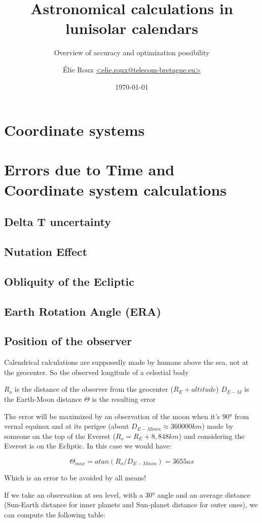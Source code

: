 \documentclass[%
a4paper,%
pagesize,%
12pt,%
parskip=off,%
bibliography=totoc,%
numbers=noenddot,%
DIV=12,%
twoside=semi,%
normalheadings%
]{scrbook}
\title{Astronomical calculations in lunisolar calendars}
\subtitle{Overview of accuracy and optimization possibility}
\author{Élie Roux \href{mailto:elie.roux@telecom-bretagne.eu}{<elie.roux@telecom-bretagne.eu>}}
\date{\today}
\let\mychapter\chapter
\let\mysection\section
\begin{document}
\maketitle

\tableofcontents
\newpage











\mychapter{Coordinate systems}

\mychapter{Errors due to Time and Coordinate system calculations}

\mysection{Delta T uncertainty}

\mysection{Nutation Effect}

\mysection{Obliquity of the Ecliptic}

\mysection{Earth Rotation Angle (ERA)}

\mysection{Position of the observer}

Calendrical calculations are supposedly made by humans above the sea, not at the geocenter. So the observed longitude of a celestial body 

$R_o$ is the distance of the observer from the geocenter ($R_E+altitude$)
$D_{E-M}$ is the Earth-Moon distance
$\Theta$ is the resulting error

The error will be maximized by an observation of the moon when it's $90°$ from vernal equinox and at its perigee (about $D_{E-Mmin}\approx360000km$) made by someone on the top of the Everest ($R_o=R_E+8,848km$) and considering the Everest is on the Ecliptic. In this case we would have:

$$\Theta_{max} = atan(R_o/D_{E-Mmin}) = 3655as$$


Which is an error to be avoided by all means!

If we take an observation at sea level, with a $30°$ angle and an average distance (Sun-Earth distance for inner planets and Sun-planet distance for outer ones), we can compute the following table:
\end{document}
